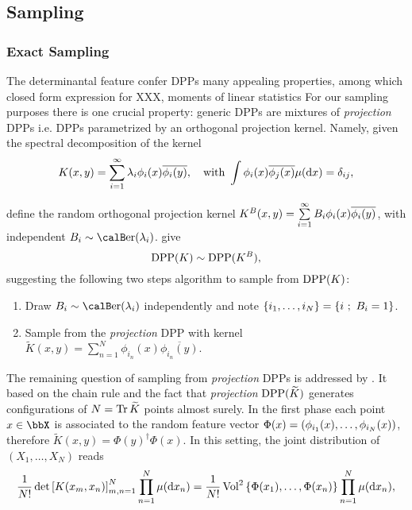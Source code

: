 \documentclass[twoside,11pt]{article}
\begin{document}
  \subsection{Sampling} %
  \label{sub:sampling}

    \subsubsection{Exact Sampling} %
    \label{ssub:exact_sampling}

      The determinantal feature confer DPPs many appealing properties, among which closed form expression for XXX, moments of linear statistics \etc
      For our sampling purposes there is one crucial property: generic DPPs are mixtures of \textit{projection} DPPs i.e. DPPs parametrized by an orthogonal projection kernel.
      Namely, given the spectral decomposition of the kernel
      \begin{equation}
      \label{eq:eigdec_kernel}
        K(x,y)=\sum\limits_{i=1}^{\infty} \lambda_i \phi_i(x) \overline{\phi_i(y)},
        \quad \text{with }
        \int \phi_i(x) \overline{\phi_j(x)} \mu(\mathop{}\!\mathrm{d} x) = \delta_{ij},
      \end{equation}

      define the random orthogonal projection kernel
      $
        K^B(x,y)
          = \sum\limits_{i=1}^{\infty} B_i \phi_i(x) \overline{\phi_i(y)}
      $, with independent $B_i\sim\Ber(\lambda_i)$.
      \citet[Theorem 7]{HKPV06} give
      \begin{equation}
        \operatorname{DPP}(K) \sim \operatorname{DPP}(K^B),
      \end{equation}
      suggesting the following two steps algorithm to sample from $\operatorname{DPP}(K)$:
      \begin{enumerate}
        \item Draw $B_i\sim\Ber(\lambda_i)$ independently and note $\left\{ i_1,\dots,i_{N} \right\} = \left\{ i~;~B_i=1 \right\}$.
        \item Sample from the \textit{projection} DPP with kernel $\tilde{K}(x,y) = \sum_{n=1}^{N}\phi_{i_n}(x) \overline{\phi_{i_n}(y)}$.
      \end{enumerate}

      The remaining question of sampling from \textit{projection} DPPs is addressed by \citet[Algorithm 18]{HKPV06}.
      It based on the chain rule and the fact that \textit{projection} $\operatorname{DPP}(\widetilde{K})$ generates configurations of $N=\operatorname{Tr} \widetilde{K}$ points almost surely.
      In the first phase each point $x\in \bbX$ is associated to the random feature vector $\Phi(x)=\left( \phi_{i_1}(x),\dots,\phi_{i_N}(x) \right)$, therefore $\tilde{K}(x,y) = \Phi(y)^{\dagger} \Phi(x)$.
      In this setting, the joint distribution of $(X_1,\dots,X_N)$ reads
      \begin{equation}
      \label{eq:joint_distribution}
        \frac{1}{N!} \det \left[ K(x_m,x_n) \right]_{m,n=1}^N \prod_{n=1}^N\mu(\mathop{}\!\mathrm{d} x_n)
          = \frac{1}{N!} \operatorname{Vol}^2\left\{ \Phi(x_1),\dots,\Phi(x_n) \right\} \prod_{n=1}^N\mu(\mathop{}\!\mathrm{d} x_n),
      \end{equation}
\end{document}
